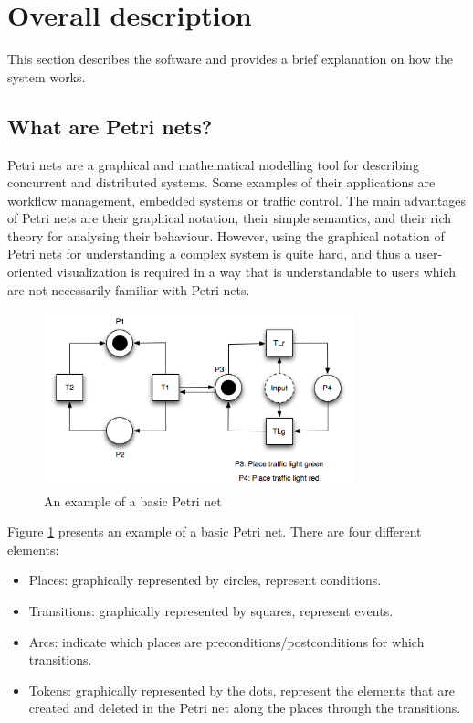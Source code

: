 \section{Overall description}

This section describes the software and provides a brief explanation on how the system works.

\subsection{What are Petri nets?}

Petri nets are a graphical and mathematical modelling tool for describing concurrent and distributed systems. Some examples of their applications are workflow management, embedded systems or traffic control. The main advantages of Petri nets are their graphical notation, their simple semantics, and their rich theory for analysing their behaviour. However, using the graphical notation of Petri nets for understanding a complex system is quite hard, and thus a user-oriented visualization is required in a way that is understandable to users which are not necessarily familiar with Petri nets.


\begin{figure}[htp]
\begin{center}
  \includegraphics[width=0.8\textwidth]{image/petrinet_diagram_2.png}
  \caption{An example of a basic Petri net}
  \label{fig:petrinet}
\end{center}
\end{figure}

Figure \ref{fig:petrinet} presents an example of a basic Petri net. There are four different elements:

\begin{itemize}
\item Places: graphically represented by circles, represent conditions.
\item Transitions: graphically represented by squares, represent events.
\item Arcs: indicate which places are preconditions/postconditions for which transitions.
\item Tokens: graphically represented by the dots, represent the elements that are created and deleted in the Petri net along the places through the transitions.
\end{itemize}


